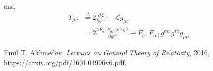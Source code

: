 \documentclass[]{article}
\newcommand{\Lagr}{\mathscr{L}}
\begin{document}
and
\begin{align}
T_{\mu\nu}&\overset{\Delta}{=}2 \frac{\partial \Lagr}{\partial g^{\mu\nu}} - \Lagr g_{\mu\nu}\\
&=2\frac{\partial F_{\sigma\tau}\, F_{\alpha\beta} \, g^{\sigma\alpha} \, g^{\tau\beta}}{\partial g^{\mu\nu}} - F_{\sigma\tau}\, F_{\alpha\beta} \, g^{\sigma\alpha} \, g^{\tau\beta} g_{\mu\nu}
\end{align}

\begin{thebibliography}{9}

Emil T. Akhmedev,
\emph{Lectures on General Theory of Relativity},
2016,
\url{https://arxiv.org/pdf/1601.04996v6.pdf}.

\end{thebibliography}
\end{document}
